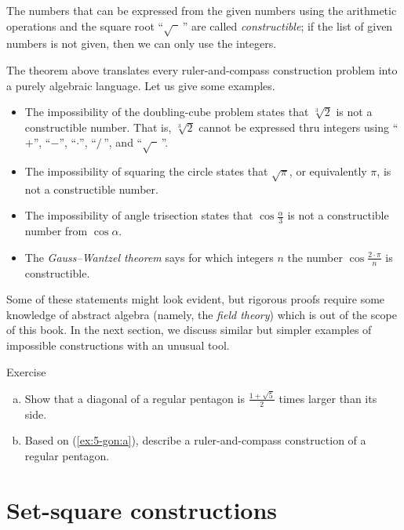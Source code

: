 The numbers that can be expressed from the given numbers using the arithmetic operations and the square root ``$\sqrt{\phantom{a}}\,$'' are called \emph{constructible};
if the list of given numbers is not given, then we can only use the integers.

{\sloppy
The theorem above translates every ruler-and-compass construction problem into a purely algebraic language.
Let us give some examples.
\begin{itemize}
\item The impossibility of the doubling-cube problem states that $\sqrt[3]{2}$ is not a constructible number.
That is, $\sqrt[3]{2}$ cannot be expressed thru integers using
``$+$'', ``$-$'', ``$\cdot$'', ``$/\,$'', and ``$\sqrt{\phantom{a}}\,$''.

\item The impossibility of squaring the circle states that 
$\sqrt{\pi}$, or equivalently $\pi$, is not a constructible number.

\item The impossibility of angle trisection states that $\cos\tfrac\alpha3$ is not a constructible number from $\cos\alpha$.

\item The \emph{Gauss--Wantzel theorem} says for which integers $n$ the number 
$\cos\tfrac{2\cdot\pi}n$ is constructible.
\end{itemize} 
Some of these statements might look evident, 
but rigorous proofs require some knowledge of abstract algebra (namely, the \textit{field theory})
which is out of the scope of this book. 
In the next section, we discuss similar but simpler examples of impossible constructions with an unusual tool.

}


\begin{thm}{Exercise}\label{ex:5-gon}
\begin{enumerate}[(a)]
 \item\label{ex:5-gon:a} Show that a diagonal of a regular pentagon is $\tfrac{1+\sqrt5}2$ times larger than its side.
 \item\label{ex:5-gon:b} Based on (\ref{ex:5-gon:a}), describe a ruler-and-compass construction of a regular pentagon.
\end{enumerate}
\end{thm}

\section{Set-square constructions}

